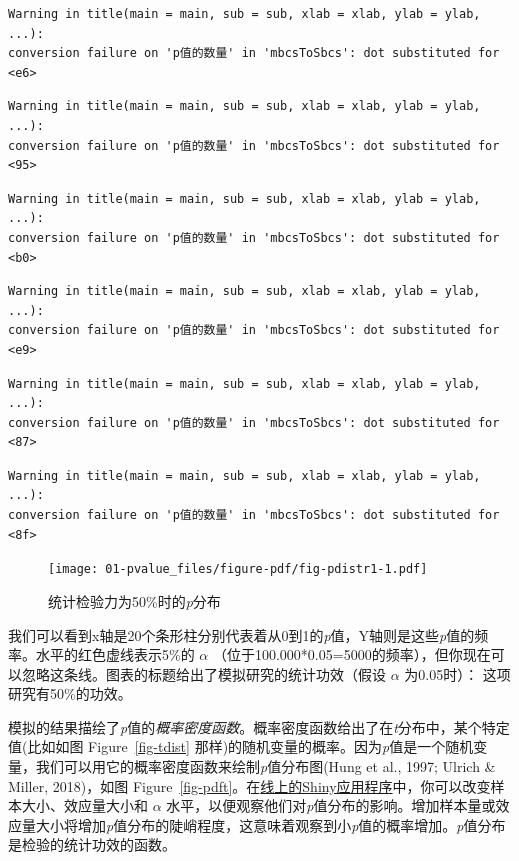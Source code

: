 \documentclass[
  letterpaper,
  DIV=11,
  numbers=noendperiod]{scrreprt}
\begin{document}
\begin{verbatim}
Warning in title(main = main, sub = sub, xlab = xlab, ylab = ylab, ...):
conversion failure on 'p值的数量' in 'mbcsToSbcs': dot substituted for <e6>
\end{verbatim}

\begin{verbatim}
Warning in title(main = main, sub = sub, xlab = xlab, ylab = ylab, ...):
conversion failure on 'p值的数量' in 'mbcsToSbcs': dot substituted for <95>
\end{verbatim}

\begin{verbatim}
Warning in title(main = main, sub = sub, xlab = xlab, ylab = ylab, ...):
conversion failure on 'p值的数量' in 'mbcsToSbcs': dot substituted for <b0>
\end{verbatim}

\begin{verbatim}
Warning in title(main = main, sub = sub, xlab = xlab, ylab = ylab, ...):
conversion failure on 'p值的数量' in 'mbcsToSbcs': dot substituted for <e9>
\end{verbatim}

\begin{verbatim}
Warning in title(main = main, sub = sub, xlab = xlab, ylab = ylab, ...):
conversion failure on 'p值的数量' in 'mbcsToSbcs': dot substituted for <87>
\end{verbatim}

\begin{verbatim}
Warning in title(main = main, sub = sub, xlab = xlab, ylab = ylab, ...):
conversion failure on 'p值的数量' in 'mbcsToSbcs': dot substituted for <8f>
\end{verbatim}

\begin{figure}

{\centering \texttt{[image: 01-pvalue\_files/figure-pdf/fig-pdistr1-1.pdf]}

}

\caption{\label{fig-pdistr1}统计检验力为50\%时的\emph{p}分布}

\end{figure}

我们可以看到x轴是20个条形柱分别代表着从0到1的\emph{p}值，Y轴则是这些\emph{p}值的频率。水平的红色虚线表示5\%的
\(\alpha\)
（位于100.000*0.05=5000的频率），但你现在可以忽略这条线。图表的标题给出了模拟研究的统计功效（假设
\(\alpha\) 为0.05时）： 这项研究有50\%的功效。

模拟的结果描绘了\emph{p}值的\emph{概率密度函数}。概率密度函数给出了在\emph{t}分布中，某个特定值(比如如图
Figure~\ref{fig-tdist}
那样)的随机变量的概率。因为\emph{p}值是一个随机变量，我们可以用它的概率密度函数来绘制\emph{p}值分布图(Hung
et al., 1997; Ulrich \& Miller, 2018)，如图
Figure~\ref{fig-pdft}。在\href{http://shiny.ieis.tue.nl/d_p_power/}{线上的Shiny应用程序}中，你可以改变样本大小、效应量大小和
\(\alpha\)
水平，以便观察他们对\emph{p}值分布的影响。增加样本量或效应量大小将增加\emph{p}值分布的陡峭程度，这意味着观察到小\emph{p}值的概率增加。\emph{p}值分布是检验的统计功效的函数。
\end{document}
